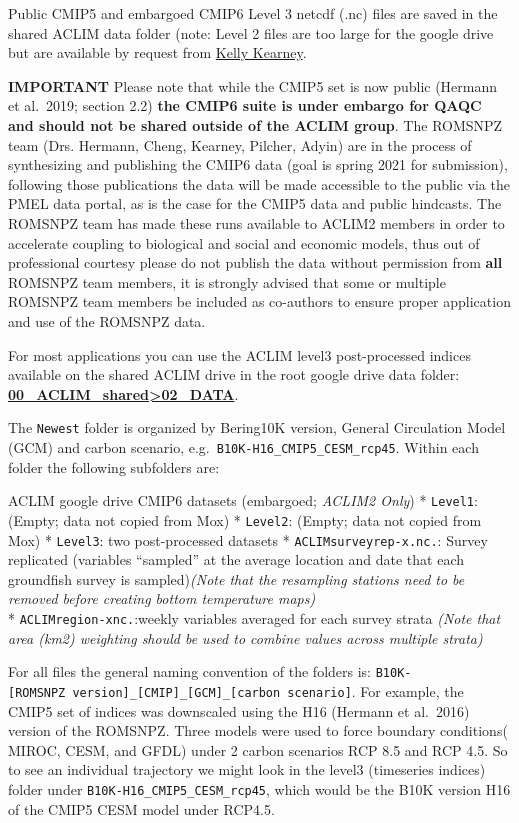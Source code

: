\documentclass[
]{article}
\begin{document}
Public CMIP5 and embargoed CMIP6 Level 3 netcdf (.nc) files are saved in
the shared ACLIM data folder (note: Level 2 files are too large for the
google drive but are available by request from
\href{kelly.kearney@noaa.gov}{Kelly Kearney}.

\textbf{IMPORTANT} Please note that while the CMIP5 set is now public
(Hermann et al.~2019; section 2.2) \textbf{the CMIP6 suite is under
embargo for QAQC and should not be shared outside of the ACLIM group}.
The ROMSNPZ team (Drs. Hermann, Cheng, Kearney, Pilcher, Adyin) are in
the process of synthesizing and publishing the CMIP6 data (goal is
spring 2021 for submission), following those publications the data will
be made accessible to the public via the PMEL data portal, as is the
case for the CMIP5 data and public hindcasts. The ROMSNPZ team has made
these runs available to ACLIM2 members in order to accelerate coupling
to biological and social and economic models, thus out of professional
courtesy please do not publish the data without permission from
\textbf{all} ROMSNPZ team members, it is strongly advised that some or
multiple ROMSNPZ team members be included as co-authors to ensure proper
application and use of the ROMSNPZ data.

For most applications you can use the ACLIM level3 post-processed
indices available on the shared ACLIM drive in the root google drive
data folder:
\href{https://drive.google.com/drive/u/0/folders/0Bx7wdZllbuF9eDJndkhCS2EwQUk}{\textbf{00\_ACLIM\_shared\textgreater02\_DATA}}.

The \texttt{Newest} folder is organized by Bering10K version, General
Circulation Model (GCM) and carbon scenario,
e.g.~\texttt{B10K-H16\_CMIP5\_CESM\_rcp45}. Within each folder the
following subfolders are:

ACLIM google drive CMIP6 datasets (embargoed; \emph{ACLIM2 Only}) *
\texttt{Level1}: (Empty; data not copied from Mox) * \texttt{Level2}:
(Empty; data not copied from Mox) * \texttt{Level3}: two post-processed
datasets * \texttt{ACLIMsurveyrep-x.nc.}: Survey replicated (variables
``sampled'' at the average location and date that each groundfish survey
is sampled)\emph{(Note that the resampling stations need to be removed
before creating bottom temperature maps)}\\
* \texttt{ACLIMregion-xnc.}:weekly variables averaged for each survey
strata \emph{(Note that area (km2) weighting should be used to combine
values across multiple strata)}

For all files the general naming convention of the folders is:
\texttt{B10K-{[}ROMSNPZ\ version{]}\_{[}CMIP{]}\_{[}GCM{]}\_{[}carbon\ scenario{]}}.
For example, the CMIP5 set of indices was downscaled using the H16
(Hermann et al.~2016) version of the ROMSNPZ. Three models were used to
force boundary conditions( MIROC, CESM, and GFDL) under 2 carbon
scenarios RCP 8.5 and RCP 4.5. So to see an individual trajectory we
might look in the level3 (timeseries indices) folder under
\texttt{B10K-H16\_CMIP5\_CESM\_rcp45}, which would be the B10K version
H16 of the CMIP5 CESM model under RCP4.5.
\end{document}

